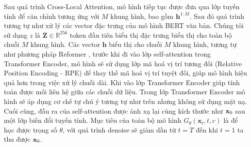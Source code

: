 Sau quá trình Cross-Local Attention, mô hình tiếp tục được đưa qua lớp tuyến tính để căn chỉnh tương ứng với $M$ khung hình, bao gồm $\mathbf{h}^{1:M}$.
Sau đó quá trình tương tự như xử lý các vector đặc trưng của mô hình BERT \cite{devlin2019bertpretrainingdeepbidirectional} văn bản. Chúng tôi sử dụng $z$ là $\mathbf{Z} \in \mathbb{R}^{256}$ token đầu tiên biểu thị đặc trưng biểu thị cho toàn bộ chuỗi $M$ khung hình. 
Các vector $\mathbf{h}$ biểu thị cho chuỗi $M$ khung hình, tương tự như phương pháp Reformer \cite{kitaev2020reformer}, trước khi đi vào lớp self-attention trong Transformer Encoder, mô hình sẽ sử dụng lớp mã hoá vị trí tương đối (Relative Position Encoding - RPE) để thay thế mã hoá vị trí tuyệt đối, giúp mô hình hiệu quả hơn trong việc xử lý chuỗi dài.
Khi vào lớp Transformer Encoder \cite{vaswani2017attention} giúp tính toán được mối liên hệ giữa các chuỗi dữ liệu. Trong lớp Transformer Encoder mô hình sẽ áp dụng cơ chế tự chú ý tương tự như trên nhưng không sử dụng mặt nạ. 
Cuối cùng, đầu ra của self-attention được ánh xạ lại cùng kích thước như $\mathbf{x}_{0}$ sau một lớp biến đổi tuyến tính. Mục tiêu của toàn bộ mô hình $G_\theta ( \mathbf{x}_t, t, c )$ là để học được trọng số $\theta$, với quá trình denoise sẽ giảm dần từ $t = T$ đến khi $t = 1$ ta thu được $\mathbf{x}_0$.


